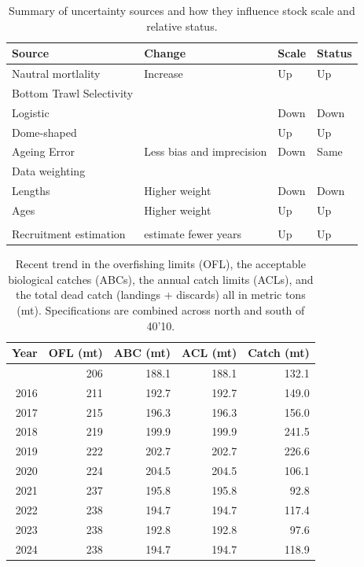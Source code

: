 \documentclass[
]{scrartcl}
\begin{document}
\newpage{}

\begingroup
\fontsize{9.0pt}{10.8pt}\selectfont

\begin{longtable}{llll}

\caption{\label{tbl-uncertainty_summary}Summary of uncertainty sources
and how they influence stock scale and relative status.}

\tabularnewline

\toprule
Source & Change & Scale & Status \\ 
\midrule\addlinespace[2.5pt]
Nautral mortlality & Increase & Up & Up \\ 
Bottom Trawl Selectivity &  &  &  \\ 
Logistic &  & Down & Down \\ 
Dome-shaped &  & Up & Up \\ 
Ageing Error & Less bias and imprecision & Down & Same \\ 
Data weighting &  &  &  \\ 
Lengths & Higher weight & Down & Down \\ 
Ages & Higher weight & Up & Up \\ 
 &  &  &  \\ 
Recruitment estimation & estimate fewer years & Up & Up \\ 
\bottomrule

\end{longtable}

\endgroup

\newpage{}

\begingroup
\fontsize{9.0pt}{10.8pt}\selectfont

\begin{longtable}{rrrrr}

\caption{\label{tbl-man-management}Recent trend in the overfishing
limits (OFL), the acceptable biological catches (ABCs), the annual catch
limits (ACLs), and the total dead catch (landings + discards) all in
metric tons (mt). Specifications are combined across north and south of
40'10.}

\tabularnewline

\toprule
Year & OFL (mt) & ABC (mt) & ACL (mt) & Catch (mt) \\ 
\midrule\addlinespace[2.5pt]
2015 & 206 & 188.1 & 188.1 & 132.1 \\ 
2016 & 211 & 192.7 & 192.7 & 149.0 \\ 
2017 & 215 & 196.3 & 196.3 & 156.0 \\ 
2018 & 219 & 199.9 & 199.9 & 241.5 \\ 
2019 & 222 & 202.7 & 202.7 & 226.6 \\ 
2020 & 224 & 204.5 & 204.5 & 106.1 \\ 
2021 & 237 & 195.8 & 195.8 & 92.8 \\ 
2022 & 238 & 194.7 & 194.7 & 117.4 \\ 
2023 & 238 & 192.8 & 192.8 & 97.6 \\ 
2024 & 238 & 194.7 & 194.7 & 118.9 \\ 
\bottomrule

\end{longtable}
\end{document}
